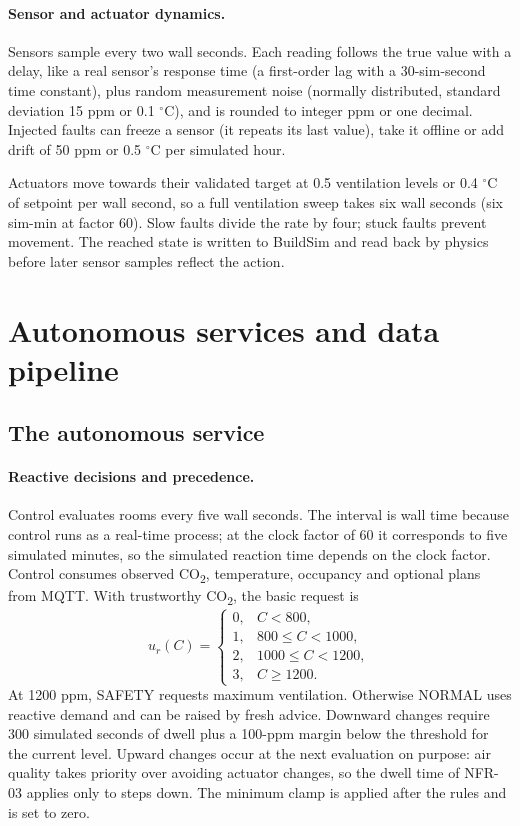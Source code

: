 \documentclass[11pt,a4paper]{article}
\begin{document}
\paragraph{Sensor and actuator dynamics.}
Sensors sample every two wall seconds. Each reading follows the true value with a delay, like a real sensor's response time (a first-order lag with a 30-sim-second time constant), plus random measurement noise (normally distributed, standard deviation 15 ppm or 0.1 $^\circ$C), and is rounded to integer ppm or one decimal. Injected faults can freeze a sensor (it repeats its last value), take it offline or add drift of 50 ppm or 0.5 $^\circ$C per simulated hour.

Actuators move towards their validated target at 0.5 ventilation levels or 0.4 $^\circ$C of setpoint per wall second, so a full ventilation sweep takes six wall seconds (six sim-min at factor 60). Slow faults divide the rate by four; stuck faults prevent movement. The reached state is written to BuildSim and read back by physics before later sensor samples reflect the action.

\section{Autonomous services and data pipeline}
\subsection{The autonomous service}\label{sec:autonomous}
\paragraph{Reactive decisions and precedence.}
Control evaluates rooms every five wall seconds. The interval is wall time because control runs as a real-time process; at the clock factor of 60 it corresponds to five simulated minutes, so the simulated reaction time depends on the clock factor. Control consumes observed CO\textsubscript{2}, temperature, occupancy and optional plans from MQTT. With trustworthy CO\textsubscript{2}, the basic request is
\begin{equation}
u_r(C)=\begin{cases}0,&C<800,\\1,&800\leq C<1000,\\
2,&1000\leq C<1200,\\3,&C\geq1200.\end{cases}
\end{equation}
At 1200 ppm, SAFETY requests maximum ventilation. Otherwise NORMAL uses reactive demand and can be raised by fresh advice. Downward changes require 300 simulated seconds of dwell plus a 100-ppm margin below the threshold for the current level. Upward changes occur at the next evaluation on purpose: air quality takes priority over avoiding actuator changes, so the dwell time of NFR-03 applies only to steps down. The minimum clamp is applied after the rules and is set to zero.
\end{document}
